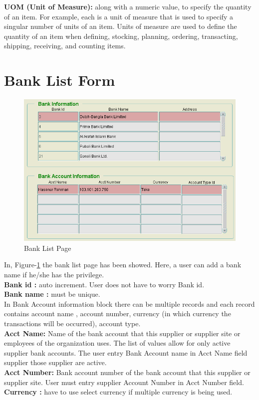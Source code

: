 \documentclass[12pt]{report} %
\begin{document}
\textbf{UOM (Unit of Measure):} along with a numeric value, to specify
the quantity of an item. For example, each is a unit of measure that is used to specify a singular number of units of an item. Units of measure are used to define the quantity of an item when defining, stocking, planning, ordering, transacting, shipping, receiving, and counting items.\\



\section{Bank List Form}

\begin{figure}[h]
	\includegraphics[width=1\textwidth]{pic/bank_list_page.PNG}
	\caption{Bank List Page}
	\label{fig:bank_list_page}
\end{figure}
In, Figure-\ref{fig:bank_list_page} the bank list page has been showed. Here, a user can add a bank name if he/she has the privilege.\\
\textbf{Bank id :} auto increment. User does not have to worry  Bank id.\\ 
\textbf{Bank name :} must be unique. \\
In Bank Account information block there can be multiple records and each record contains account name , account number, currency (in which currency the transactions will be occurred), account type. \\
\textbf{Acct Name:} Name of the bank account that this supplier or supplier site or employees of the organization uses. The list of values allow for only active supplier bank accounts. The user entry Bank Account name in Acct Name field supplier those supplier are active. \\
\textbf{Acct Number:} Bank account number of the bank account that this supplier or supplier site. User must entry supplier Account Number in Acct Number field.\\
\textbf{Currency :} have to use select currency if multiple currency is being used.
\end{document}
